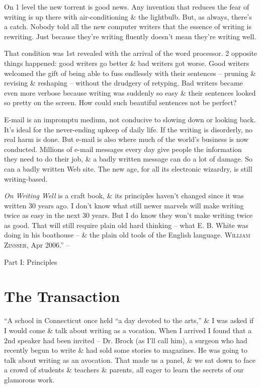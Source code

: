 \documentclass{article}
\begin{document}
On 1 level the new torrent is good news. Any invention that reduces the fear of writing is up there with air-conditioning \& the lightbulb. But, as always, there's a catch. Nobody told all the new computer writers that the essence of writing is rewriting. Just because they're writing fluently doesn't mean they're writing well.

That condition was 1st revealed with the arrival of the word processor. 2 opposite things happened: good writers go better \& bad writers got worse. Good writers welcomed the gift of being able to fuss endlessly with their sentences -- pruning \& revising \& reshaping -- without the drudgery of retyping. Bad writers became even more verbose because writing was suddenly so easy \& their sentences looked so pretty on the screen. How could such beautiful sentences not be perfect?

E-mail is an impromptu medium, not conducive to slowing down or looking back. It's ideal for the never-ending upkeep of daily life. If the writing is disorderly, no real harm is done. But e-mail is also where much of the world's business is now conducted. Millions of e-mail messages every day give people the information they need to do their job, \& a badly written message can do a lot of damage. So can a badly written Web site. The new age, for all its electronic wizardry, is still writing-based.

\textit{On Writing Well} is a craft book, \& its principles haven't changed since it was written 30 years ago. I don't know what still newer marvels will make writing twice as easy in the next 30 years. But I do know they won't make writing twice as good. That will still require plain old hard thinking -- what E. B. White was doing in his boathouse -- \& the plain old tools of the English language. \textsc{William Zinsser}, Apr 2006.'' -- \cite[pp. 5--8]{Zinsser2016}


\begin{center}\huge
	Part I: Principles
\end{center}


\section{The Transaction}
``A school in Connecticut once held ``a day devoted to the arts,'' \& I was asked if I would come \& talk about writing as a vocation. When I arrived I found that a 2nd speaker had been invited -- Dr. Brock (as I'll call him), a surgeon who had recently begun to write \& had sold some stories to magazines. He was going to talk about writing as an avocation. That made us a panel, \& we sat down to face a crowd of students \& teachers \& parents, all eager to learn the secrets of our glamorous work.
\end{document}
